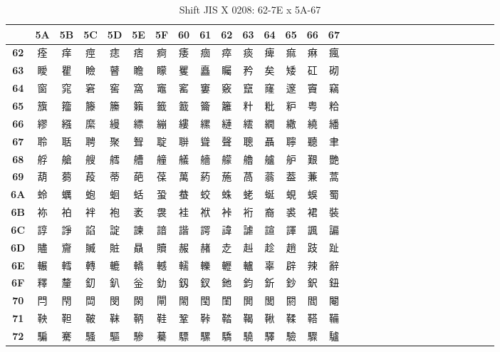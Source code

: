\begin{table}[H]
\Fontified
\centering
\caption{Shift JIS X 0208: 62-7E x 5A-67}
\begin{tabular}{|Sc|Sc|Sc|Sc|Sc|Sc|Sc|Sc|Sc|Sc|Sc|Sc|Sc|Sc|Sc|}
\hline
 & \textbf{5A} & \textbf{5B} & \textbf{5C} & \textbf{5D} & \textbf{5E} & \textbf{5F} & \textbf{60} & \textbf{61} & \textbf{62} & \textbf{63} & \textbf{64} & \textbf{65} & \textbf{66} & \textbf{67} \\ \hline
\textbf{62} & 痊 & 痒 & 痙 & 痣 & 痞 & 痾 & 痿 & 痼 & 瘁 & 痰 & 痺 & 痲 & 痳 & 瘋 \\ \hline
\textbf{63} & 瞹 & 瞿 & 瞼 & 瞽 & 瞻 & 矇 & 矍 & 矗 & 矚 & 矜 & 矣 & 矮 & 矼 & 砌 \\ \hline
\textbf{64} & 窗 & 窕 & 窘 & 窖 & 窩 & 竈 & 窰 & 窶 & 竅 & 竄 & 窿 & 邃 & 竇 & 竊 \\ \hline
\textbf{65} & 籏 & 籀 & 籐 & 籘 & 籟 & 籤 & 籖 & 籥 & 籬 & 籵 & 粃 & 粐 & 粤 & 粭 \\ \hline
\textbf{66} & 繆 & 繦 & 縻 & 縵 & 縹 & 繃 & 縷 & 縲 & 縺 & 繧 & 繝 & 繖 & 繞 & 繙 \\ \hline
\textbf{67} & 聆 & 聒 & 聘 & 聚 & 聟 & 聢 & 聨 & 聳 & 聲 & 聰 & 聶 & 聹 & 聽 & 聿 \\ \hline
\textbf{68} & 艀 & 艙 & 艘 & 艝 & 艚 & 艟 & 艤 & 艢 & 艨 & 艪 & 艫 & 舮 & 艱 & 艷 \\ \hline
\textbf{69} & 葫 & 蒭 & 葮 & 蒂 & 葩 & 葆 & 萬 & 葯 & 葹 & 萵 & 蓊 & 葢 & 蒹 & 蒿 \\ \hline
\textbf{6A} & 蛉 & 蠣 & 蚫 & 蛔 & 蛞 & 蛩 & 蛬 & 蛟 & 蛛 & 蛯 & 蜒 & 蜆 & 蜈 & 蜀 \\ \hline
\textbf{6B} & 袮 & 袙 & 袢 & 袍 & 袤 & 袰 & 袿 & 袱 & 裃 & 裄 & 裔 & 裘 & 裙 & 裝 \\ \hline
\textbf{6C} & 諄 & 諍 & 諂 & 諚 & 諫 & 諳 & 諧 & 諤 & 諱 & 謔 & 諠 & 諢 & 諷 & 諞 \\ \hline
\textbf{6D} & 贐 & 齎 & 贓 & 賍 & 贔 & 贖 & 赧 & 赭 & 赱 & 赳 & 趁 & 趙 & 跂 & 趾 \\ \hline
\textbf{6E} & 輾 & 轌 & 轉 & 轆 & 轎 & 轗 & 轜 & 轢 & 轣 & 轤 & 辜 & 辟 & 辣 & 辭 \\ \hline
\textbf{6F} & 釋 & 釐 & 釖 & 釟 & 釡 & 釛 & 釼 & 釵 & 釶 & 鈞 & 釿 & 鈔 & 鈬 & 鈕 \\ \hline
\textbf{70} & 閂 & 閇 & 閊 & 閔 & 閖 & 閘 & 閙 & 閠 & 閨 & 閧 & 閭 & 閼 & 閻 & 閹 \\ \hline
\textbf{71} & 鞅 & 靼 & 鞁 & 靺 & 鞆 & 鞋 & 鞏 & 鞐 & 鞜 & 鞨 & 鞦 & 鞣 & 鞳 & 鞴 \\ \hline
\textbf{72} & 騙 & 騫 & 騷 & 驅 & 驂 & 驀 & 驃 & 騾 & 驕 & 驍 & 驛 & 驗 & 驟 & 驢 \\ \hline

\end{tabular}
\end{table}
